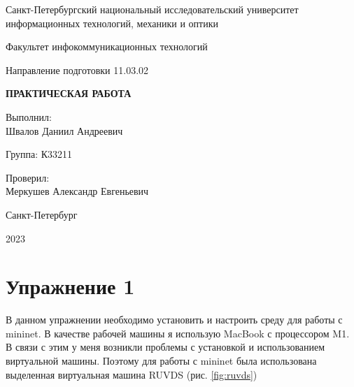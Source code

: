 \documentclass[a4paper, 14pt]{extarticle}
\begin{document}
\begin{titlepage}
  \vspace{0pt plus2fill}
  \noindent

  \vspace{0pt plus6fill}
  \begin{center}
    Санкт-Петербургский национальный исследовательский университет
    информационных технологий, механики и оптики

    \vspace{0pt plus3fill}

    Факультет инфокоммуникационных технологий

    Направление подготовки 11.03.02

    \vspace{0pt plus2fill}

    \textbf{ПРАКТИЧЕСКАЯ РАБОТА}

  \end{center}

  \vspace{0pt plus9fill}
  \begin{flushright}
    Выполнил: \\
    Швалов Даниил Андреевич

    Группа: К33211

    Проверил: \\
    Меркушев Александр Евгеньевич
  \end{flushright}

  \vspace{0pt plus2fill}
  \begin{center}
    Санкт-Петербург

    2023
  \end{center}
\end{titlepage}

\setcounter{page}{2}

\section*{Упражнение 1}

В данном упражнении необходимо установить и настроить среду для работы с
mininet. В качестве рабочей машины я использую MacBook с процессором M1. В связи
с этим у меня возникли проблемы с установкой и использованием виртуальной
машины. Поэтому для работы с mininet была использована выделенная виртуальная
машина RUVDS (рис. \ref{fig:ruvds})
\end{document}
